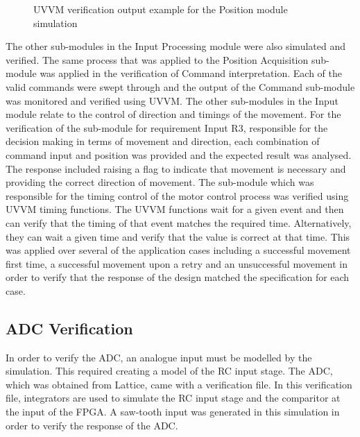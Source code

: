 \begin{figure}[h]
\centering
{}
\caption{UVVM verification output example for the Position module simulation}
\label{uvvm_results}
\end{figure}

The other sub-modules in the Input Processing module were also simulated and verified. The same process that was applied to the Position Acquisition sub-module was applied in the verification of Command interpretation. Each of the valid commands were swept through and the output of the Command sub-module was monitored and verified using UVVM. The other sub-modules in the Input module relate to the control of direction and timings of the movement. For the verification of the sub-module for requirement Input R3, responsible for the decision making in terms of movement and direction, each combination of command input and position was provided and the expected result was analysed. The response included raising a flag to indicate that movement is necessary and providing the correct direction of movement. The sub-module which was responsible for the timing control of the motor control process was verified using UVVM timing functions. The UVVM functions wait for a given event and then can verify that the timing of that event matches the required time. Alternatively, they can wait a given time and verify that the value is correct at that time. This was applied over several of the application cases including a successful movement first time, a successful movement upon a retry and an unsuccessful movement in order to verify that the response of the design matched the specification for each case.

\subsection{ADC Verification}

In order to verify the ADC, an analogue input must be modelled by the simulation. This required creating a model of the RC input stage. The ADC, which was obtained from Lattice, came with a verification file. In this verification file, integrators are used to simulate the RC input stage and the comparitor at the input of the FPGA. A saw-tooth input was generated in this simulation in order to verify the response of the ADC. 

